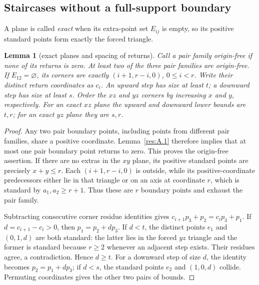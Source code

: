 \documentclass[11pt]{article}
\newtheorem{lemma}[theorem]{Lemma}
\theoremstyle{definition}
\theoremstyle{remark}
\theoremstyle{plain}
\begin{document}
\subsection{Staircases without a full-support boundary}
A plane is called \emph{exact} when its extra-point set $E_{ij}$ is empty,
so its positive standard points form exactly the forced triangle.
\begin{lemma}[exact planes and spacing of returns]\label{res:A.20} Call a pair family origin-free if none of its returns is zero. At least two of the three pair families are origin-free. If \(E_{12}=\varnothing\), its corners are exactly \((i+1,r-i,0)\), \(0\le i<r\). Write their distinct return coordinates as \(c_i\). An upward step has size at least \(t\); a downward step has size at least \(s\). Order the \(xz\) and \(yz\) corners by increasing \(x\) and \(y\), respectively. For an exact \(xz\) plane the upward and downward lower bounds are \(t,r\); for an exact \(yz\) plane they are \(s,r\).
\end{lemma}
\begin{proof} Any two pair boundary points, including points from different pair families, share a positive coordinate. Lemma~\ref{res:A.1} therefore implies that at most one pair boundary point returns to zero. This proves the origin-free assertion. If there are no extras in the \(xy\) plane, its positive standard points are precisely \(x+y\le r\). Each \((i+1,r-i,0)\) is outside, while its positive-coordinate predecessors either lie in that triangle or on an axis at coordinate \(r\), which is standard by \(a_1,a_2\ge r+1\). Thus these are \(r\) boundary points and exhaust the pair family.

Subtracting consecutive corner residue identities gives
\(c_{i+1}p_3+p_2=c_ip_3+p_1\).
If \(d=c_{i+1}-c_i>0\), then \(p_1=p_2+dp_3\). If \(d<t\), the distinct points \(e_1\) and \((0,1,d)\) are both standard: the latter lies in the forced \(yz\) triangle and the former is standard because \(r\ge2\) whenever an adjacent step exists. Their residues agree, a contradiction. Hence \(d\ge t\). For a downward step of size \(d\), the identity becomes \(p_2=p_1+dp_3\); if \(d<s\), the standard points \(e_2\) and \((1,0,d)\) collide. Permuting coordinates gives the other two pairs of bounds. \end{proof}
\end{document}
